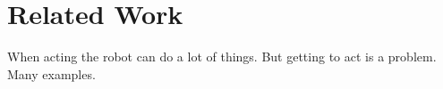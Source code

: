 \section{Related Work}
\label{sec:relatedwork}

When acting the robot can do a lot of things. But getting to act
is a problem. Many examples.